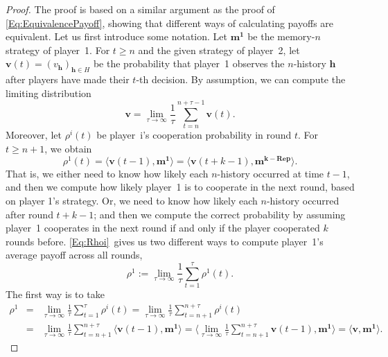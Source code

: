 \documentclass[9pt,twoside,lineno]{pnas-new}
\theoremstyle{plainCl1}
\theoremstyle{plainCl2}
\begin{document}
\begin{proof}
The proof is based on a similar argument as the proof of \eqref{Eq:EquivalencePayoff}, showing that different ways of calculating payoffs are equivalent. 
Let us first introduce some notation. 
Let $\mathbf{m^1}$ be the memory-$n$ strategy of player~1. 
For $t\!\ge\!n$ and the given strategy of player~2, let $\mathbf{v}(t)\!=\!(v_\mathbf{h})_{\mathbf{h}\in H}$ be the probability that player~1 observes the $n$-history $\mathbf{h}$ after players have made their $t$-th decision. 
By assumption, we can compute the limiting distribution
\begin{equation} \label{Eq:TimeAverageAppendix}
\mathbf{v} = \lim_{\tau\to\infty} \frac{1}{\tau} \sum_{t=n}^{n+\tau-1} \mathbf{v}(t).  
\end{equation}
Moreover, let $\rho^i(t)$ be player~i's cooperation probability in round $t$. 
For $t\!\ge\!n\!+\!1$, we obtain 
\begin{equation} \label{Eq:Rhoi}
\rho^1(t) = \big\langle \mathbf{v}(t\!-\!1) , \mathbf{m^1}\big\rangle = \big\langle \mathbf{v}(t\!+\!k\!-\!1), \mathbf{m^{k-\text{Rep}}}\big\rangle.
\end{equation}
That is, we either need to know how likely each $n$-history occurred at time $t\!-\!1$, and then we compute how likely player~1 is to cooperate in the next round, based on player 1's strategy. 
Or, we need to know how likely each $n$-history occurred after round $t\!+\!k\!-\!1$; and then we compute the correct probability by assuming player~1 cooperates in the next round if and only if the player cooperated $k$ rounds before. 
\eqref{Eq:Rhoi}~gives us two different ways to compute player~1's average payoff across all rounds,
\begin{equation}
\rho^1 := \lim_{\tau \to \infty} \frac{1}{\tau} \sum_{t=1}^\tau \rho^1(t).
\end{equation}
The first way is to take
\begin{equation*}
\begin{array}{rcl}
\rho^1 &= &\displaystyle 
\lim_{\tau \to \infty} \frac{1}{\tau} \sum_{t=1}^\tau \rho^i(t) 
= \lim_{\tau \to \infty} \frac{1}{\tau} \sum_{t=n+1}^{n+\tau} \rho^i(t)\\[0.5cm]
&= &\displaystyle 
\lim_{\tau \to \infty} \frac{1}{\tau} \sum_{t=n+1}^{n+\tau}  \big\langle \mathbf{v}(t\!-\!1) , \mathbf{m^1}\big\rangle 
=  \big\langle  \lim_{\tau \to \infty} \frac{1}{\tau} \sum_{t=n+1}^{n+\tau} \mathbf{v}(t\!-\!1) , \mathbf{m^1}\big\rangle
= \big\langle \mathbf{v},\mathbf{m^1} \big\rangle.
\end{array}

\end{equation*}
\end{proof}
\end{document}

